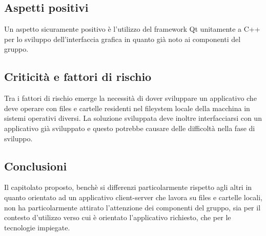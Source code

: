 \subsection{Aspetti positivi}
Un aspetto sicuramente positivo è l’utilizzo del framework Qt unitamente a C++  per lo sviluppo dell’interfaccia grafica in quanto già noto ai componenti del gruppo.


\subsection{Criticità e fattori di rischio}
Tra i fattori di rischio emerge la necessità di dover sviluppare un applicativo che deve operare con files e cartelle residenti nel fileystem locale della macchina in sistemi operativi diversi.
La soluzione sviluppata deve inoltre interfacciarsi con un applicativo già sviluppato e questo potrebbe causare delle difficoltà nella fase di sviluppo.

\subsection{Conclusioni}
Il capitolato proposto, benchè si differenzi particolarmente rispetto agli altri in quanto orientato ad un applicativo client-server che lavora su files e cartelle locali, non ha particolarmente attirato l’attenzione dei componenti del gruppo, sia per il contesto d'utilizzo verso cui è orientato l’applicativo richiesto, che per le tecnologie impiegate.

\newpage
